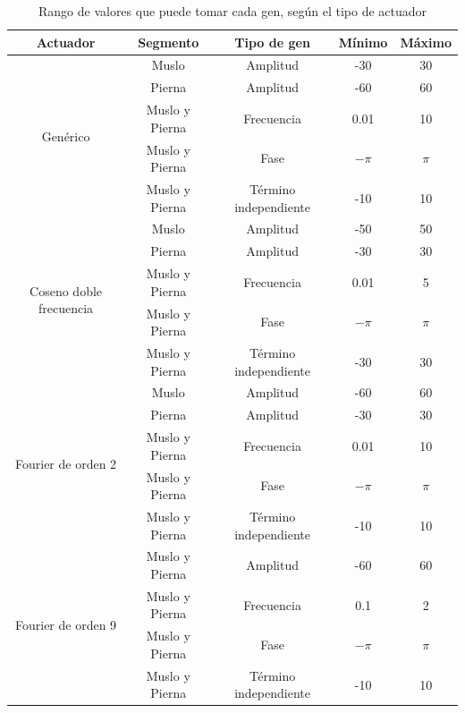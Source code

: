 \documentclass{article}
\begin{document}
\begin{table}[H]%
  \centering
  	\begin{tabular}{ | c | c | c || c | c | }
	  		\hline
	  		\textbf{Actuador} & \textbf{Segmento} & \textbf{Tipo de gen} & \textbf{M\'inimo} & \textbf{M\'aximo} \\
			\hline
			\multirow{5}{*}{Gen\'erico} & Muslo & Amplitud & -30 & 30\\ \cline{2-5}
								&Pierna & Amplitud & -60 & 60\\ \cline{2-5}
	  							& Muslo y Pierna & Frecuencia & 0.01 & 10 \\ \cline{2-5}
	  							&Muslo y Pierna & Fase & $-\pi$ & $\pi$ \\ \cline{2-5}
								& Muslo y Pierna & T\'ermino independiente & -10 & 10 \\ 
	  		\hline 
			\hline
			\multirow{5}{*}{Coseno doble frecuencia} & Muslo & Amplitud & -50 & 50\\ \cline{2-5}
								& Pierna & Amplitud & -30 & 30\\ \cline{2-5}
	  							& Muslo y Pierna & Frecuencia & 0.01 & 5 \\ \cline{2-5}
	  							&Muslo y Pierna & Fase & $-\pi$ & $\pi$ \\ \cline{2-5}
								& Muslo y Pierna & T\'ermino independiente & -30 & 30 \\ \cline{2-5}
			\hline 
			\hline					
			\multirow{5}{*}{Fourier de orden 2} & Muslo & Amplitud & -60 & 60\\ \cline{2-5}
	  							&Pierna & Amplitud & -30 & 30 \\ \cline{2-5}
								& Muslo y Pierna & Frecuencia & 0.01 & 10 \\ \cline{2-5}
	  							&Muslo y Pierna & Fase & $-\pi$ & $\pi$ \\ \cline{2-5}
								& Muslo y Pierna & T\'ermino independiente & -10 & 10 \\
	  		\hline
			\hline
			\multirow{4}{*}{Fourier de orden 9} & Muslo y Pierna & Amplitud & -60 & 60\\ \cline{2-5}
	  							& Muslo y Pierna & Frecuencia & 0.1 & 2 \\ \cline{2-5}
	  							&Muslo y Pierna & Fase & $-\pi$ & $\pi$ \\ \cline{2-5}
								& Muslo y Pierna & T\'ermino independiente & -10 & 10 \\
			
			\hline
	\end{tabular}
  \captionsetup{justification=centering}
  \caption{Rango de valores que puede tomar cada gen, seg\'un el tipo de actuador }%
  \label{table3}%
\end{table}
\end{document}
